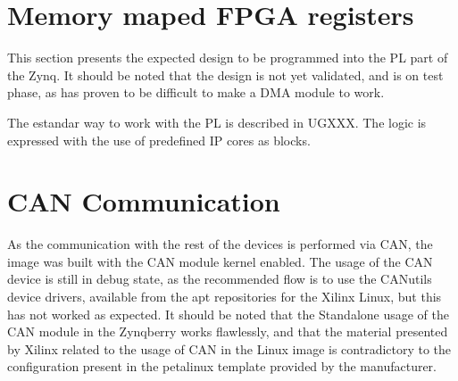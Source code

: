 \section{Memory maped FPGA registers}

This section presents the expected design to be programmed into the PL part of the Zynq. It should
be noted that the design is not yet validated, and is on test phase, as has proven to be difficult
to make a DMA module to work.

The estandar way to work with the PL is described in UGXXX. The logic is expressed with the use of
predefined IP cores as blocks.

\section{CAN Communication}

As the communication with the rest of the devices is performed via CAN, the image was built with the
CAN module kernel enabled. The usage of the CAN device is still in debug state, as the recommended
flow is to use the CANutils device drivers, available from the apt repositories for the Xilinx
Linux, but this has not worked as expected. It should be noted that the Standalone usage of the CAN
module in the Zynqberry works flawlessly, and that the material presented by Xilinx related to
the usage of CAN in the Linux image is contradictory to the configuration present in the petalinux
template provided by the manufacturer.

